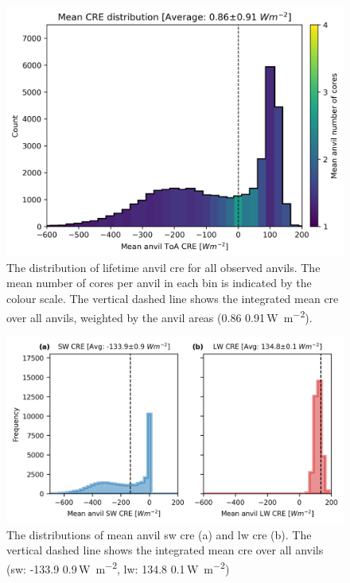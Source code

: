 \begin{figure}[t]
    \includegraphics[width=\textwidth]{figures/ch3_11.png}
    \caption[
    The distribution of lifetime anvil \acrshort{cre} for all observed anvils
    ]{
    The distribution of lifetime anvil \acrshort{cre} for all observed anvils. The mean number of cores per anvil in each bin is indicated by the colour scale. The vertical dashed line shows the integrated mean \acrshort{cre} over all anvils, weighted by the anvil areas (0.86\,\textpm\,0.91\,\unit{W m^{-2}}).
    }
    \label{fig:anvil_cre_dist}
\end{figure}


\begin{figure}[t]
    \includegraphics[width=\textwidth]{figures/ch3_12.png}
    \caption[
    The distributions of mean anvil \acrshort{sw} \acrshort{cre} and \acrshort{lw} \acrshort{cre}
    ]{
    The distributions of mean anvil \acrshort{sw} \acrshort{cre} (a) and \acrshort{lw} \acrshort{cre} (b). The vertical dashed line shows the integrated mean \acrshort{cre} over all anvils (\acrshort{sw}: -133.9\,\textpm\,0.9\,\unit{W m^{-2}}, \acrshort{lw}: 134.8\,\textpm\,0.1\,\unit{W m^{-2}})
    }
    \label{fig:anvil_sw_lw_cre}
\end{figure}


